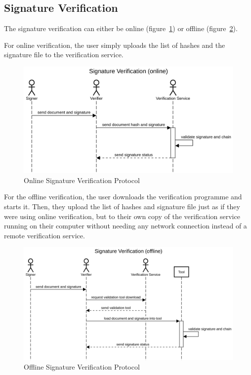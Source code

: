\pagebreak

\subsection{Signature Verification}\label{subsec:signature-verification}

The signature verification can either be online (figure~\ref{fig:onlinesignatureverificationprotocol})
or offline (figure~\ref{fig:offlinesignatureverificationprotocol}).

For online verification, the user simply uploads the list of hashes and the signature file to the verification service.

\begin{figure}[H]
    \begin{center}
        \includegraphics[width=0.9\linewidth]{images/protocol_online_verification_high_level.png}
        \caption{Online Signature Verification Protocol}
        \label{fig:onlinesignatureverificationprotocol}
    \end{center}
\end{figure}

For the offline verification, the user downloads the verification programme and starts it.
Then, they upload the list of hashes and signature file just as if they were using online verification,
but to their own copy of the verification service running on their computer without needing any network connection
instead of a remote verification service.

\begin{figure}[H]
    \begin{center}
        \includegraphics[width=0.9\linewidth]{images/protocol_offline_verification_high_level.png}
        \caption{Offline Signature Verification Protocol}
        \label{fig:offlinesignatureverificationprotocol}
    \end{center}
\end{figure}
\pagebreak

